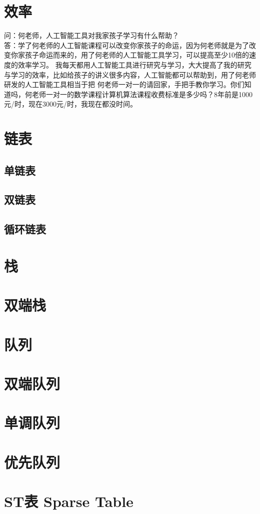 \documentclass[12pt,twiside,a4paper]{ctexbook}
\numberwithin{chapter}{part}
\begin{document}
\section{效率}
问：何老师，人工智能工具对我家孩子学习有什么帮助？\\
答：学了何老师的人工智能课程可以改变你家孩子的命运，因为何老师就是为了改变你家孩子命运而来的，用了何老师的人工智能工具学习，可以提高至少10倍的速度的效率学习。
我每天都用人工智能工具进行研究与学习，大大提高了我的研究与学习的效率，比如给孩子的讲义很多内容，人工智能都可以帮助到，用了何老师研发的人工智能工具相当于把
何老师一对一的请回家，手把手教你学习。你们知道吗，何老师一对一的数学课程计算机算法课程收费标准是多少吗？8年前是1000元/时，现在3000元/时，我现在都没时间。

\section{链表}
\subsection{单链表}
\subsection{双链表}
\subsection{循环链表}

\section{栈}
\section{双端栈}
\section{队列}
\section{双端队列}
\section{单调队列}
\section{优先队列}
\section{ST表 Sparse Table}
\end{document}
